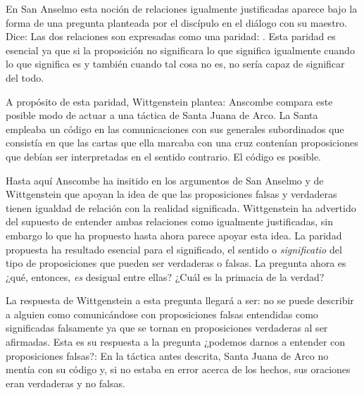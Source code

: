 En San Anselmo esta noción de relaciones igualmente justificadas aparece bajo la
forma de una pregunta planteada por el discípulo en el diálogo con su maestro.
Dice: 
Las dos relaciones son expresadas como una paridad: . Esta paridad es
esencial ya que si la proposición no significara lo que significa igualmente
cuando lo que significa es y también cuando tal cosa no es, no sería capaz de
significar del todo.

A propósito de esta paridad, Wittgenstein plantea: 
Anscombe compara este posible modo de actuar a una táctica de Santa Juana de
Arco. La Santa empleaba un código en las comunicaciones con sus generales
subordinados que consistía en que las cartas que ella marcaba con una cruz
contenían proposiciones que debían ser interpretadas en el sentido contrario. El
código es posible.

Hasta aquí Anscombe ha insitido en los argumentos de San Anselmo y de
Wittgenstein que apoyan la idea de que las proposiciones falsas y verdaderas
tienen igualdad de relación con la realidad significada. Wittgenstein ha
advertido del supuesto de entender ambas relaciones como igualmente
justificadas, sin embargo lo que ha propuesto hasta ahora parece apoyar esta
idea. La paridad propuesta ha resultado esencial para el significado, el sentido
o \emph{significatio} del tipo de proposiciones que pueden ser verdaderas o
falsas. La pregunta ahora es ¿qué, entonces, \emph{es} desigual entre ellas?
¿Cuál es la primacia de la verdad?

La respuesta de Wittgenstein a esta pregunta llegará a ser: no se puede
describir a alguien como comunicándose con proposiciones falsas entendidas como
significadas falsamente ya que se tornan en proposiciones verdaderas al ser
afirmadas. Esta es su respuesta a la pregunta ¿podemos darnos a entender con
proposiciones falsas?:  En la
táctica antes descrita, Santa Juana de Arco no mentía con su código y, si no
estaba en error acerca de los hechos, sus oraciones eran verdaderas y no falsas.

